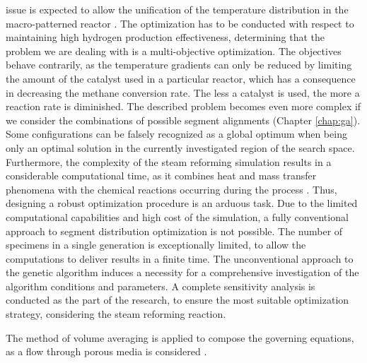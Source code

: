issue is expected to allow the unification of the temperature distribution in the macro-patterned reactor \cite{Pajak2018}. The optimization has to be conducted with respect to maintaining high hydrogen production effectiveness, determining that the problem we are dealing with is a multi-objective optimization. The objectives behave contrarily, as the temperature gradients can only be reduced by limiting the amount of the catalyst used in a particular reactor, which has a consequence in decreasing the methane conversion rate. The less a catalyst is used, the more a reaction rate is diminished. The described problem becomes even more complex if we consider the combinations of possible segment alignments (Chapter \ref{chap:ga}). Some configurations can be falsely recognized as a global optimum when being only an optimal solution in the currently investigated region of the search space. Furthermore, the complexity of the steam reforming simulation results in a considerable computational time, as it combines heat and mass transfer phenomena with the chemical reactions occurring during the process \cite{Brus2012}. Thus, designing a robust optimization procedure is an arduous task. Due to the limited computational capabilities and high cost of the simulation, a fully conventional approach to segment distribution optimization is not possible. The number of specimens in a single generation is exceptionally limited, to allow the computations to deliver results in a finite time. The unconventional approach to the genetic algorithm induces a necessity for a comprehensive investigation of the algorithm conditions and parameters. A complete sensitivity analysis is conducted as the part of the research, to ensure the most suitable optimization strategy, considering the steam reforming reaction.











The method of volume averaging is applied to compose the governing equations, as a flow through porous media is considered \cite{Whitaker1999, Brus2014}.



